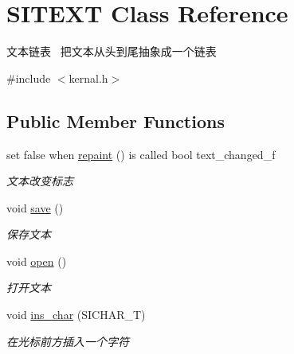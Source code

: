\hypertarget{class_s_i_t_e_x_t}{}\section{S\+I\+T\+E\+XT Class Reference}
\label{class_s_i_t_e_x_t}


文本链表~\newline
把文本从头到尾抽象成一个链表  




{\ttfamily \#include $<$kernal.\+h$>$}

\subsection*{Public Member Functions}
\begin{DoxyCompactItemize}
\item 
\mbox{\label{class_s_i_t_e_x_t_a944194c2df3c4ba2c599de6fbe0f98c2}} 
set false when \hyperlink{class_s_i_t_e_x_t_a944194c2df3c4ba2c599de6fbe0f98c2}{repaint} () is called bool text\+\_\+changed\+\_\+f
\begin{DoxyCompactList}\small\item\em 文本改变标志 \end{DoxyCompactList}\item 
\mbox{\label{class_s_i_t_e_x_t_a4dd44878d55139898fcead669e074c2e}} 
void \hyperlink{class_s_i_t_e_x_t_a4dd44878d55139898fcead669e074c2e}{save} ()
\begin{DoxyCompactList}\small\item\em 保存文本 \end{DoxyCompactList}\item 
\mbox{\label{class_s_i_t_e_x_t_a270a832a88596618a424d8d9f9d3cb80}} 
void \hyperlink{class_s_i_t_e_x_t_a270a832a88596618a424d8d9f9d3cb80}{open} ()
\begin{DoxyCompactList}\small\item\em 打开文本 \end{DoxyCompactList}\item 
\mbox{\label{class_s_i_t_e_x_t_a6324f46cb5b509caca467ee700305f0c}} 
void \hyperlink{class_s_i_t_e_x_t_a6324f46cb5b509caca467ee700305f0c}{ins\+\_\+char} (S\+I\+C\+H\+A\+R\+\_\+T)
\begin{DoxyCompactList}\small\item\em 在光标前方插入一个字符 \end{DoxyCompactList}\item 

\end{DoxyCompactItemize}
